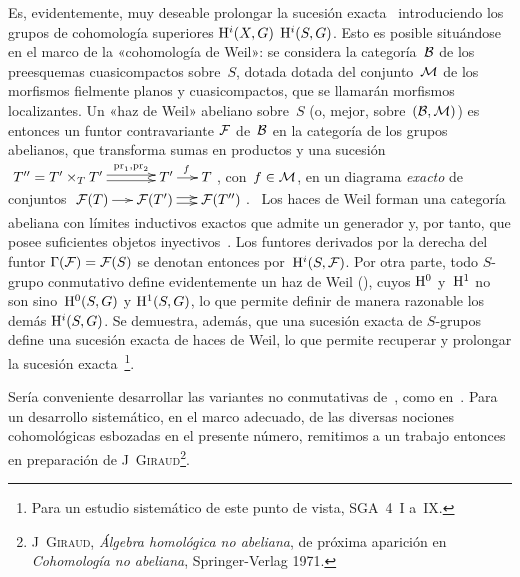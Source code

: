 \sganum
\label{XI.4.8}
Es, evidentemente, muy deseable prolongar la sucesión exacta~
introduciendo los grupos de cohomología superiores
{$\H^i(X,G)$}
{$\H^i(S,G)$}.
Esto es posible situándose en el marco de la «cohomología de Weil»: se
considera la categoría~$\cal{B}$ de los preesquemas cuasicompactos sobre~$S$,
{dotada}
{dotada}
del conjunto~$\cal{M}$ de los morfismos fielmente planos y cuasicompactos,
que se llamarán morfismos localizantes. Un «haz de Weil» abeliano sobre~$S$
(o, mejor, sobre~$(\cal{B},\cal{M})$) es entonces un funtor contravariante
$\cal{F}$ de~$\cal{B}$ en la categoría de los grupos abelianos, que transforma
sumas en productos y una sucesión
\begingroup
\shorthandoff{<>}%
${\def\labelstyle{\scriptstyle}\xymatrix@C=.5cm{T''=T'\times_TT'\ar@<+2pt>[rr]^-{\pr_1,\pr_2}\ar@<-2pt>[rr] &&T'\ar[r]^f & T}}$,
con~$f\in\cal{M}$, en un diagrama \emph{exacto} de conjuntos
$\xymatrix@C=.5cm{\cal{F}(T)\ar[r] & \cal{F}(T')
\ar@<2pt>[r]\ar@<-2pt>[r] & \cal{F}(T'')}$.%
\endgroup\ 
Los haces de Weil forman una categoría abeliana con límites inductivos
exactos que admite un generador y, por tanto, que posee suficientes objetos
inyectivos~\cite{XI.1}. Los funtores derivados por la derecha del funtor
$\Gamma(\cal{F})=\cal{F}(S)$ se denotan entonces por~$\H^i(S,\cal{F})$. Por
otra parte, todo $S$-grupo conmutativo define evidentemente un haz de Weil
(\Ref{VIII.5.2}), cuyos $\H^0$ y~$\H^1$ no son sino~$\H^0(S,G)$ y
$\H^1(S,G)$, lo que permite definir de manera razonable los demás
$\H^i(S,G)$. Se
demuestra, además, que una sucesión exacta de $S$-grupos define una sucesión
exacta de haces de Weil, lo que permite recuperar y prolongar la sucesión
exacta~\Ref{XI.4.5}\footnote{Para un estudio sistemático de este punto de
vista, \cf SGA~4~I a~IX.}.

\sganum
\label{XI.4.9}
Sería conveniente desarrollar las variantes no conmutativas de~,
como en~\cite{XI.2}. Para un desarrollo sistemático, en el marco adecuado,
de las diversas nociones cohomológicas esbozadas en el presente número,
remitimos a un trabajo entonces en preparación de
J\ptbl\ \textsc{Giraud}\footnote{\Cf J\ptbl\ \textsc{Giraud},
{\emph{Álgebra homológica no abeliana}, de próxima aparición en}
{\emph{Cohomología no abeliana},}
Springer-Verlag 1971.}.
